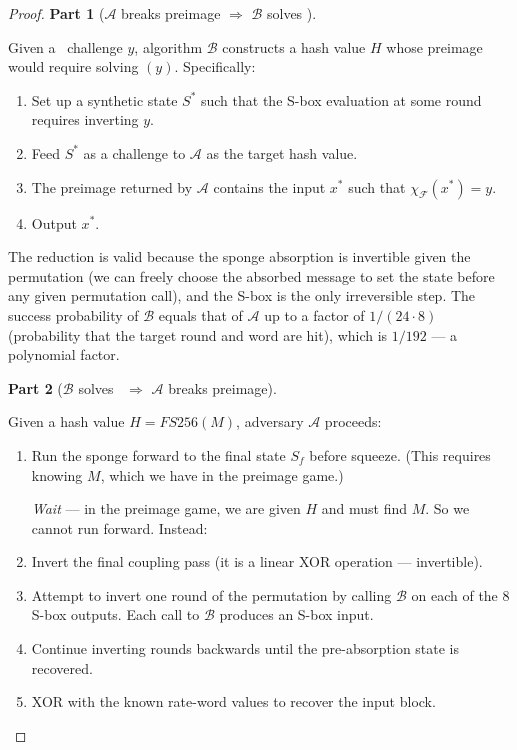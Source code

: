 \documentclass[11pt]{article}
\theoremstyle{definition}
\theoremstyle{remark}
\newcommand{\sbox}{\chi_{\mathcal{F}}} %
\newcommand{\FIP}{\mathsf{FIP}}       %
\begin{document}
\begin{proof}
\textbf{Part 1} ($\mathcal{A}$ breaks preimage $\Rightarrow$ $\mathcal{B}$ solves \FIP).

Given a \FIP\ challenge $y$, algorithm $\mathcal{B}$ constructs a hash value
$H$ whose preimage would require solving \FIP$(y)$. Specifically:

\begin{enumerate}
    \item Set up a synthetic state $S^*$ such that the S-box evaluation at
          some round requires inverting $y$.
    \item Feed $S^*$ as a challenge to $\mathcal{A}$ as the target hash value.
    \item The preimage returned by $\mathcal{A}$ contains the input $x^*$ such
          that $\sbox(x^*) = y$.
    \item Output $x^*$.
\end{enumerate}

The reduction is valid because the sponge absorption is invertible given the
permutation (we can freely choose the absorbed message to set the state before
any given permutation call), and the S-box is the only irreversible step.
The success probability of $\mathcal{B}$ equals that of $\mathcal{A}$ up to
a factor of $1/(24 \cdot 8)$ (probability that the target round and word are
hit), which is $1/192$ --- a polynomial factor.

\medskip
\textbf{Part 2} ($\mathcal{B}$ solves \FIP\ $\Rightarrow$ $\mathcal{A}$ breaks preimage).

Given a hash value $H = \mathit{FS256}(M)$, adversary $\mathcal{A}$ proceeds:

\begin{enumerate}
    \item Run the sponge forward to the final state $S_f$ before squeeze.
          (This requires knowing $M$, which we have in the preimage game.)

          \textit{Wait} --- in the preimage game, we are given $H$ and must
          find $M$. So we cannot run forward. Instead:

    \item Invert the final coupling pass (it is a linear XOR operation ---
          invertible).
    \item Attempt to invert one round of the permutation by calling $\mathcal{B}$
          on each of the 8 S-box outputs. Each call to $\mathcal{B}$ produces
          an S-box input.
    \item Continue inverting rounds backwards until the pre-absorption state
          is recovered.
    \item XOR with the known rate-word values to recover the input block.
\end{enumerate}


\end{proof}
\end{document}
